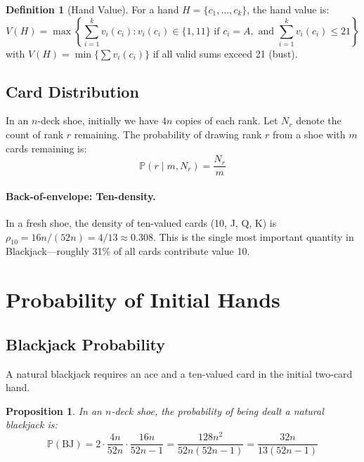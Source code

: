 \documentclass[11pt,a4paper]{article}
\newtheorem{proposition}[theorem]{Proposition}
\theoremstyle{definition}
\newtheorem{definition}[theorem]{Definition}
\newcommand{\Prob}{\mathbb{P}}
\begin{document}
\begin{definition}[Hand Value]
For a hand $H = \{c_1, \ldots, c_k\}$, the hand value is:
\begin{equation}
V(H) = \max\left\{ \sum_{i=1}^{k} v_i(c_i) : v_i(c_i) \in \{1, 11\} \text{ if } c_i = A, \text{ and } \sum_{i=1}^{k} v_i(c_i) \leq 21 \right\}
\end{equation}
with $V(H) = \min\{\sum v_i(c_i)\}$ if all valid sums exceed 21 (bust).
\end{definition}

\subsection{Card Distribution}

In an $n$-deck shoe, initially we have $4n$ copies of each rank. Let $N_r$ denote the count of rank $r$ remaining. The probability of drawing rank $r$ from a shoe with $m$ cards remaining is:
\begin{equation}
\Prob(r \mid m, N_r) = \frac{N_r}{m}
\end{equation}

\paragraph{Back-of-envelope: Ten-density.} In a fresh shoe, the density of ten-valued cards (10, J, Q, K) is $\rho_{10} = 16n/(52n) = 4/13 \approx 0.308$. This is the single most important quantity in Blackjack---roughly 31\% of all cards contribute value 10.

\section{Probability of Initial Hands}

\subsection{Blackjack Probability}

A natural blackjack requires an ace and a ten-valued card in the initial two-card hand.

\begin{proposition}
In an $n$-deck shoe, the probability of being dealt a natural blackjack is:
\begin{equation}
\Prob(\text{BJ}) = 2 \cdot \frac{4n}{52n} \cdot \frac{16n}{52n - 1} = \frac{128n^2}{52n(52n-1)} = \frac{32n}{13(52n-1)}
\end{equation}
\end{proposition}
\end{document}
